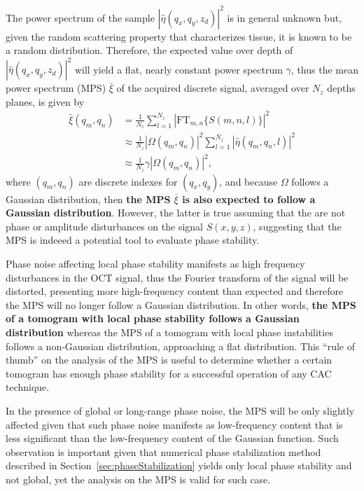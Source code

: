The power spectrum of the sample $|\hat{\eta}(q_x, q_y, z_d)|^2$ is in general unknown but, given the random scattering property that characterizes tissue, it is known to be a random distribution. Therefore, the expected value over depth of $|\hat{\eta}(q_x, q_y, z_d)|^2$ will yield a flat, nearly constant power spectrum $\gamma$, thus the mean power spectrum (MPS) $\bar{\xi}$ of the acquired discrete signal, averaged over $N_z$ depths planes, is given by
\begin{align}
    \bar{\xi}(q_m, q_n) &= \frac{1}{N_z}\sum_{l=1}^{N_z}\left|\text{FT}_{m,n}\{S(m,n,l)\}\right|^2\nonumber\\
    &\approx \frac{1}{N_z}|\Omega(q_m, q_n)|^2 \sum_{l=1}^{N_z} |\hat{\eta}(q_m, q_n, l)|^2 \nonumber\\
    &\approx \frac{1}{N_z}\gamma|\Omega(q_m, q_n)|^2,
\end{align}
where $(q_m,q_n)$ are discrete indexes for $(q_x,q_y)$, and because $\Omega$ follows a Gaussian distribution, then \textbf{the MPS $\bar{\xi}$ is also expected to follow a Gaussian distribution}. However, the latter is true assuming that the are not phase or amplitude disturbances on the signal $S(x,y,z)$, suggesting that the MPS is indeeed a potential tool to evaluate phase stability.

Phase noise affecting local phase stability manifests as high frequency disturbances in the OCT signal, thus the Fourier transform of the signal will be distorted, presenting more high-frequency content than expected and therefore the MPS will no longer follow a Gaussian distribution. In other words, \textbf{the MPS of a tomogram with local phase stability follows a Gaussian distribution} whereas the MPS of a tomogram with local phase instabilities follows a non-Gaussian distribution, approaching a flat distribution. This ``rule of thumb'' on the analysis of the MPS is useful to determine whether a certain tomogram has enough phase stability for a successful operation of any CAC technique.

In the presence of global or long-range phase noise, the MPS will be only slightly affected given that such phase noise manifests as low-frequency content that is less significant than the low-frequency content of the Gaussian function. Such observation is important given that numerical phase stabilization method described in Section~\ref{sec:phaseStabilization} yields only local phase stability and not global, yet the analysis on the MPS is valid for such case.

